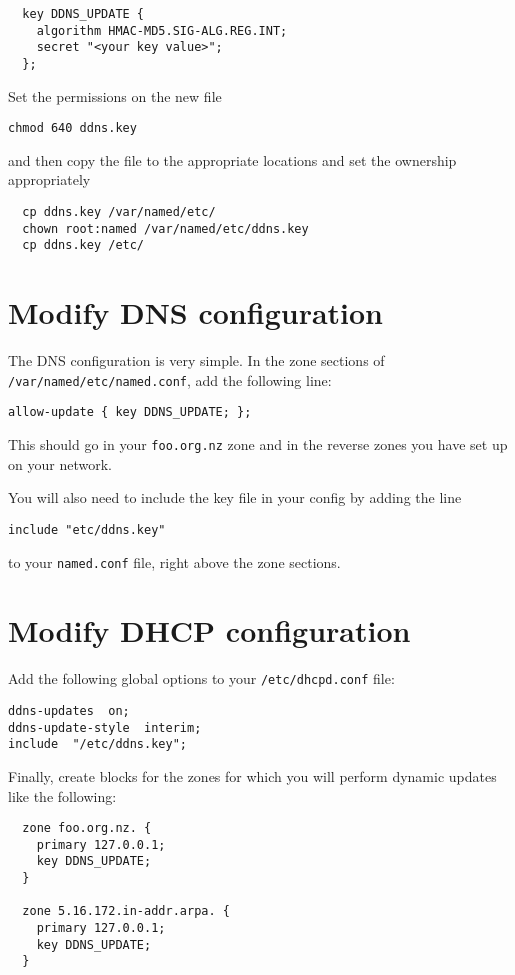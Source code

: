 \documentclass{article}
\begin{document}
\begin{verbatim}
  key DDNS_UPDATE {
    algorithm HMAC-MD5.SIG-ALG.REG.INT;
    secret "<your key value>";
  };
\end{verbatim}

Set the permissions on the new file

\texttt{chmod 640 ddns.key}

and then copy the file to the appropriate locations and set the ownership appropriately

\begin{verbatim}
  cp ddns.key /var/named/etc/
  chown root:named /var/named/etc/ddns.key
  cp ddns.key /etc/
\end{verbatim}

\section{Modify DNS configuration}
The DNS configuration is very simple.  In the zone sections of \texttt{/var/named/etc/named.conf}, add the following line:

\texttt{allow-update \{ key DDNS\_UPDATE; \};}

This should go in your \texttt{foo.org.nz} zone and in the reverse zones you have set up on your 
network.

You will also need to include the key file in your config by adding the line

\begin{verbatim}
include "etc/ddns.key"
\end{verbatim}

to your \texttt{named.conf} file, right above the zone sections.

\section{Modify DHCP configuration}
Add the following global options to your \texttt{/etc/dhcpd.conf} file:

\begin{verbatim}
ddns-updates  on;
ddns-update-style  interim;
include  "/etc/ddns.key";
\end{verbatim}

Finally, create blocks for the zones for which you will perform dynamic updates like the following:

\begin{verbatim}
  zone foo.org.nz. {
    primary 127.0.0.1;
    key DDNS_UPDATE;
  }

  zone 5.16.172.in-addr.arpa. {
    primary 127.0.0.1;
    key DDNS_UPDATE;
  }
\end{verbatim}
\end{document}
